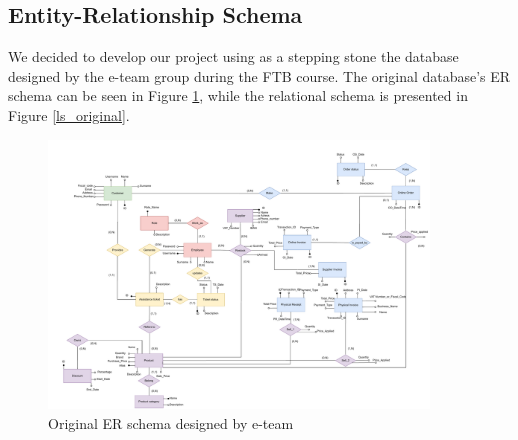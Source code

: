 \subsection{Entity-Relationship Schema}

We decided to develop our project using as a stepping stone the database designed by the e-team group during the FTB course. The original database's ER schema can be seen in Figure \ref{er_original}, while the relational schema is presented in Figure \ref{ls_original}.
\\
\begin{figure}
\centering
\includegraphics[width=0.9\textwidth,height=0.9\textheight,keepaspectratio]{Schemas/ER_original.drawio.pdf}
\caption{Original ER schema designed by e-team}
\label{er_original}
\end{figure}

